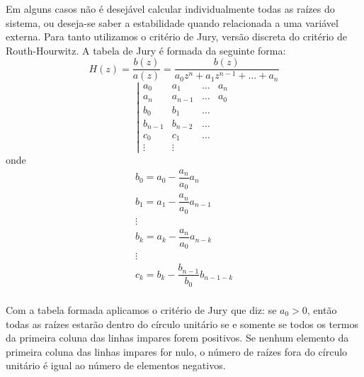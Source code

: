 Em alguns casos não é desejável calcular individualmente todas as raízes do sistema, ou deseja-se saber a estabilidade quando relacionada a uma variável externa. Para tanto utilizamos o critério de Jury, versão discreta do critério de Routh-Hourwitz. A tabela de Jury é formada da seguinte forma:
\begin{equation}
H(z)=\dfrac{b(z)}{a(z)}=\dfrac{b(z)}{a_0 z^n+a_1 z^{n-1}+\dots+a_n}
\end{equation}
\begin{equation}
\left|
\begin{matrix}
a_0 & a_1& \dots & a_n\\
a_n & a_{n-1}& \dots & a_0\\
b_0 & b_1 & \dots \\
b_{n-1} & b_{n-2} & \dots \\
c_0 & c_1 & \dots \\
\vdots & \vdots
\end{matrix}
\right.
\end{equation}
onde
\begin{equation}
\begin{matrix}
b_0=a_0- \dfrac{a_n}{a_0}a_n\\
b_1=a_1- \dfrac{a_n}{a_0}a_{n-1}\\
\vdots \\
b_k=a_k- \dfrac{a_n}{a_0}a_{n-k}\\
\vdots \\
c_k=b_k- \dfrac{b_{n-1}}{b_0}b_{n-1-k}\\
\end{matrix}
\end{equation}

Com a tabela formada aplicamos o critério de Jury que diz: se $a_0>0$, então todas as raízes estarão dentro do círculo unitário se e somente se todos os termos da primeira coluna das linhas impares forem positivos. Se nenhum elemento da primeira coluna das linhas impares for nulo, o número  de raízes fora do círculo unitário é igual ao número de elementos negativos.
















